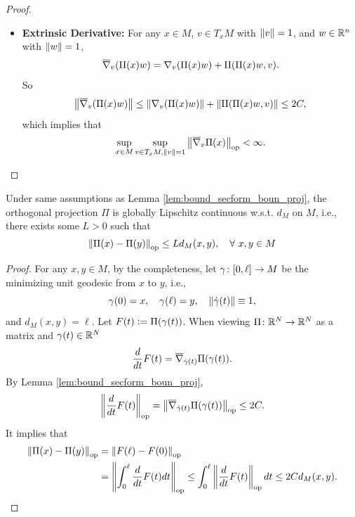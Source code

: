 \begin{proof}
\begin{itemize}
        \item \textbf{Extrinsic Derivative:} For any $x\in M$, $v \in T_xM$ with $\left\lVert v\right\lVert = 1$, and $w \in \mathbb{R}^n$ with $\left\lVert w\right\lVert = 1$,
        \begin{equation*}
            \overline{\nabla}_{v}(\Pi(x)w) = \nabla_{v}(\Pi(x)w) + \mathrm{II}(\Pi(x)w,v).
        \end{equation*}
        So
        \begin{equation*}
            \left\lVert\overline{\nabla}_{v}(\Pi(x)w)\right\lVert \leq \left\lVert\nabla_{v}(\Pi(x)w)\right\lVert + \left\lVert\mathrm{II}(\Pi(x)w,v)\right\lVert \leq 2C,
        \end{equation*}
        which implies that
        \begin{equation*}
            \sup_{x \in M}\sup_{v \in T_xM, \left\lVert v\right\lVert = 1}\left\lVert\overline{\nabla}_v\Pi(x)\right\lVert_{\operatorname{op}} < \infty. \qedhere
        \end{equation*}
    \end{itemize}
\end{proof}



\begin{cor}\label{cor:lipsch_intrin_proj}
    Under same assumptions as Lemma \ref{lem:bound_secform_boun_proj}, the orthogonal projection $\Pi$ is globally Lipschitz continuous w.s.t. $d_M$ on $M$, i.e., there exists some $L > 0$ such that
    \begin{equation*}
        \left\lVert\Pi(x) - \Pi(y)\right\lVert_{\operatorname{op}} \leq L d_M(x,y),\quad \forall~x,y \in M
    \end{equation*}
\end{cor}
\begin{proof}
    For any $x,y \in M$, by the completeness, let $\gamma \colon [0,\ell] \rightarrow M$ be the minimizing unit geodesic from $x$ to $y$, i.e.,
    \begin{equation*}
        \gamma(0) = x,\quad \gamma(\ell) = y,\quad\left\lVert\dot{\gamma}(t)\right\lVert \equiv 1,
    \end{equation*}
    and $d_M(x,y) = \ell$. Let $F(t) \vcentcolon= \Pi(\gamma(t))$. When viewing $\Pi \colon \mathbb{R}^N \rightarrow \mathbb{R}^N$ as a matrix and $\gamma(t) \in \mathbb{R}^N$
    \begin{equation*}
        \frac{d}{dt}F(t) = \overline{\nabla}_{\dot{\gamma}(t)}\Pi(\gamma(t)).
    \end{equation*}
    By Lemma \ref{lem:bound_secform_boun_proj},
    \begin{equation*}
        \left\lVert\frac{d}{dt}F(t)\right\lVert_{\operatorname{op}} = \left\lVert\overline{\nabla}_{\dot{\gamma}(t)}\Pi(\gamma(t))\right\lVert_{\operatorname{op}} \leq 2C.
    \end{equation*}
    It implies that
    \begin{align*}
        \left\lVert\Pi(x) - \Pi(y)\right\lVert_{\operatorname{op}} &= \left\lVert F(\ell) - F(0)\right\lVert_{\operatorname{op}} \\
        &= \left\lVert\int_0^\ell  \frac{d}{dt}F(t) dt\right\lVert_{\operatorname{op}} \leq \int_0^\ell  \left\lVert\frac{d}{dt}F(t)\right\lVert_{\operatorname{op}} dt \leq 2C d_M(x,y). \qedhere
    \end{align*}
\end{proof}

